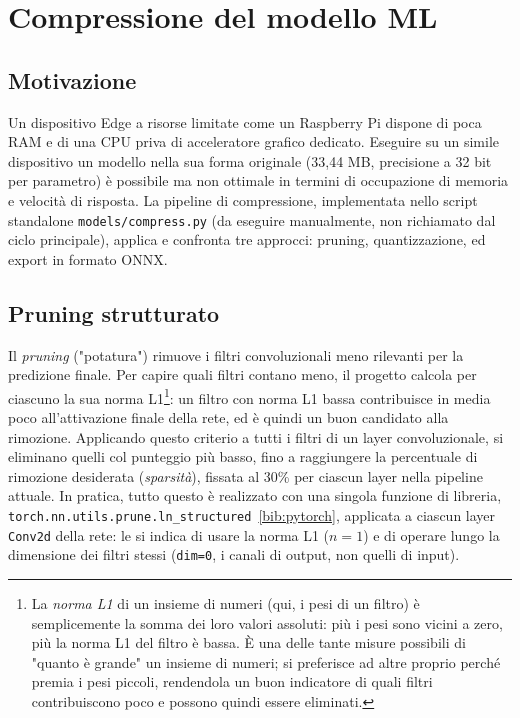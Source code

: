 \section{Compressione del modello ML}
\label{sec:compressione}

\subsection{Motivazione}

Un dispositivo Edge a risorse limitate come un Raspberry Pi dispone di
poca RAM e di una CPU priva di acceleratore grafico dedicato. Eseguire su un
simile dispositivo un modello nella sua forma originale (33,44 MB,
precisione a 32 bit per parametro) è possibile ma non ottimale in termini
di occupazione di memoria e velocità di risposta. La pipeline di
compressione, implementata nello script standalone \texttt{models/compress.py}
(da eseguire manualmente, non richiamato dal ciclo principale), applica e
confronta tre approcci: pruning, quantizzazione, ed export in formato ONNX.

\subsection{Pruning strutturato}

Il \emph{pruning} ("potatura") rimuove i filtri convoluzionali meno
rilevanti per la predizione finale. Per capire quali filtri contano meno,
il progetto calcola per ciascuno la sua norma L1\footnote{La \emph{norma
L1} di un insieme di numeri (qui, i pesi di un filtro) è semplicemente la
somma dei loro valori assoluti: più i pesi sono vicini a zero, più la
norma L1 del filtro è bassa. È una delle tante misure possibili di
"quanto è grande" un insieme di numeri; si preferisce ad altre proprio
perché premia i pesi piccoli, rendendola un buon indicatore di quali
filtri contribuiscono poco e possono quindi essere eliminati.}: un filtro
con norma L1 bassa contribuisce in media poco all'attivazione finale della
rete, ed è quindi un buon candidato alla rimozione. Applicando questo criterio a tutti i filtri di un layer
convoluzionale, si eliminano quelli col punteggio più basso, fino a
raggiungere la percentuale di rimozione desiderata (\emph{sparsità}),
fissata al 30\% per ciascun layer nella pipeline attuale. In pratica, tutto
questo è realizzato con una singola funzione di libreria,
\texttt{torch.nn.utils.prune.ln\_structured}~\ref{bib:pytorch}, applicata
a ciascun layer \texttt{Conv2d} della rete: le si indica di usare la norma
L1 ($n=1$) e di operare lungo la dimensione dei filtri stessi
(\texttt{dim=0}, i canali di output, non quelli di input).

